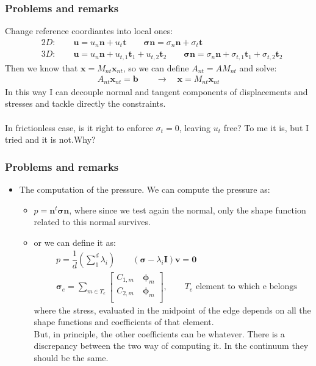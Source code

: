 \documentclass[8pt, oneside]{beamer}   	%
\newcommand{\bb}{\textbf{b}}
\newcommand{\bn}{\textbf{n}}
\newcommand{\bt}{\textbf{t}}
\newcommand{\bv}{\textbf{v}}
\newcommand{\bu}{\textbf{u}}
\newcommand{\bbx}{\textbf{x}}
\newcommand{\bphi}{\boldsymbol{\phi}}
\newcommand{\bsigma}{\boldsymbol{\sigma}}
\begin{document}
\begin{frame}
\frametitle{\textbf{Problems and remarks}}
Change reference coordiantes into local ones:
\begin{align*}
&2D: \qquad \bu = u_n \bn + u_t \bt \qquad \bsigma \bn = \sigma_n \bn + \sigma_t \bt \\
&3D: \qquad \bu = u_n \bn + u_{t,1} \bt_1 + u_{t,2} \bt_2 \qquad \bsigma \bn = \sigma_n \bn +\sigma_{t,1} \bt_1 + \sigma_{t,2} \bt_2
\end{align*}
Then we know that $\bbx= M_{nt} \bbx_{nt}$, so we can define $A_{nt}=A M_{nt} $ and solve:
\begin{align*}
A_{nt}  \bbx_{nt} =\bb \qquad \to \quad \bbx= M_{nt} \bbx_{nt}
\end{align*}
In this way I can decouple normal and tangent components of displacements and stresses and tackle directly the constraints.\\
${}$\\
In frictionless case, is it right to enforce $\sigma_t=0$, leaving $u_t$ free? To me it is, but I tried and it is not.Why?
\end{frame}


\begin{frame}
\frametitle{\textbf{Problems and remarks}}
\begin{itemize}
\item The computation of the pressure. We can compute the pressure as:
\begin{itemize}
\item $p=\bn^t \bsigma \bn$, where since we test again the normal, only the shape function related to this normal survives.
\item or we can define it as:
\begin{align*}
& p=\dfrac{1}{d} \left(\sum \limits_1^d \lambda_i \right) \qquad \left(\bsigma - \lambda_i  \textbf{I} \right) \bv =\textbf{0}\\
& \bsigma_e= \sum_{m \in T_e} \begin{bmatrix}
C_{1,m} \quad \bphi_{m}\\
C_{2,m} \quad \bphi_{m}\\
\end{bmatrix}, \qquad T_e \text{ element to which e belongs}
\end{align*}
where the stress, evaluated in the midpoint of the edge depends on all the shape functions  and coefficients of that element. \\
But, in principle, the other coefficients can be whatever. There is a discrepancy between the two way of computing it. In the continuum they should be the same.
\end{itemize} 
\end{itemize}
\end{frame}
\end{document}
